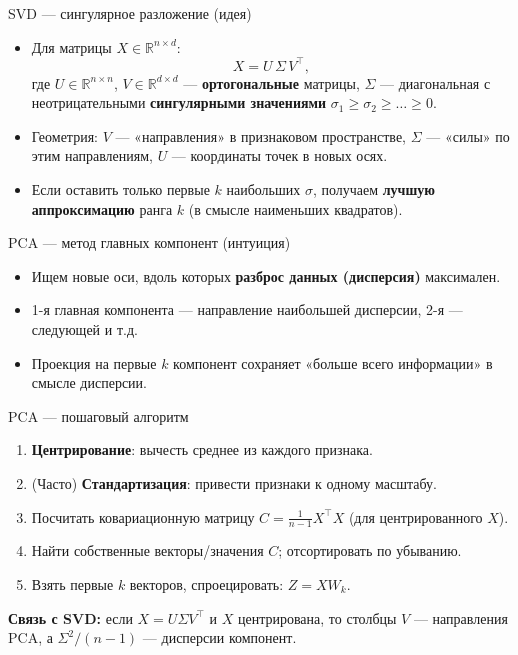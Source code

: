 \documentclass[aspectratio=169]{beamer}
\newcommand{\term}[1]{\textbf{#1}}
\newcommand{\R}{\mathbb{R}}
\begin{document}
\begin{frame}{SVD — сингулярное разложение (идея)}
	\begin{itemize}
		\item Для матрицы \(X \in \R^{n\times d}\):
		      \[
			      X = U\,\Sigma\,V^{\top},
		      \]
		      где \(U \in \R^{n\times n}\), \(V \in \R^{d\times d}\) — \term{ортогональные} матрицы,
		      \(\Sigma\) — диагональная с неотрицательными \term{сингулярными значениями} \(\sigma_1 \ge \sigma_2 \ge \dots \ge 0\).
		\item Геометрия: \(V\) — «направления» в признаковом пространстве, \(\Sigma\) — «силы» по этим направлениям, \(U\) — координаты точек в новых осях.
		\item Если оставить только первые \(k\) наибольших \(\sigma\), получаем \term{лучшую аппроксимацию} ранга \(k\) (в смысле наименьших квадратов).
	\end{itemize}
\end{frame}

\begin{frame}{PCA — метод главных компонент (интуиция)}
	\begin{itemize}
		\item Ищем новые оси, вдоль которых \term{разброс данных (дисперсия)} максимален.
		\item 1-я главная компонента — направление наибольшей дисперсии, 2-я — следующей и т.д.
		\item Проекция на первые \(k\) компонент сохраняет «больше всего информации» в смысле дисперсии.
	\end{itemize}
\end{frame}

\begin{frame}{PCA — пошаговый алгоритм}
	\begin{enumerate}
		\item \term{Центрирование}: вычесть среднее из каждого признака.
		\item (Часто) \term{Стандартизация}: привести признаки к одному масштабу.
		\item Посчитать ковариационную матрицу \(C = \frac{1}{n-1} X^\top X\) (для центрированного \(X\)).
		\item Найти собственные векторы/значения \(C\); отсортировать по убыванию.
		\item Взять первые \(k\) векторов, спроецировать: \(Z = X W_k\).
	\end{enumerate}
	\vspace{0.5em}
	\textbf{Связь с SVD:} если \(X = U\Sigma V^\top\) и \(X\) центрирована, то столбцы \(V\) — направления PCA, а \(\Sigma^2/(n-1)\) — дисперсии компонент.
\end{frame}
\end{document}
